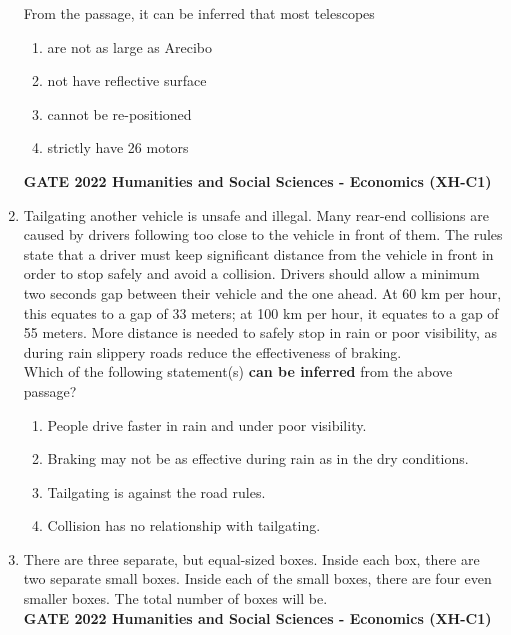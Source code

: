 \documentclass[journal,12pt,onecolumn]{exam}
\theoremstyle{remark}
\begin{document}
\begin{enumerate}
\vspace{1em}

From the passage, it can be inferred that most telescopes 


\begin{enumerate}
    \item are not as large as Arecibo 
    \item not have reflective surface 
    \item cannot be re-positioned 
    \item strictly have 26 motors
\end{enumerate}
\textbf{GATE 2022 Humanities and Social Sciences - Economics (XH-C1)}
 \item Tailgating another vehicle is unsafe and illegal. Many rear-end collisions are caused by drivers following too close to the vehicle in front of them. The rules state that a driver must keep significant distance from the vehicle in front in order to stop safely and avoid a collision. Drivers should allow a minimum two seconds gap between their vehicle and the one ahead. At 60 km per hour, this equates to a gap of 33 meters; at 100 km per hour, it equates to a gap of 55 meters. More distance is needed to safely stop in rain or poor visibility, as during rain slippery roads reduce the effectiveness of braking.\\

    Which of the following statement(s) \textbf{can be inferred} from the above passage?

  
    

    \begin{enumerate}
        \item People drive faster in rain and under poor visibility.
        \item Braking may not be as effective during rain as in the dry conditions.
        \item Tailgating is against the road rules.
        \item Collision has no relationship with tailgating.
    \end{enumerate}


\item There are three separate, but equal-sized boxes. Inside each box, there are two
separate small boxes. Inside each of the small boxes, there are four even smaller
boxes. The total number of boxes will be\underline{\hspace{2cm}}.\\


\textbf{GATE 2022 Humanities and Social Sciences - Economics (XH-C1)}\ 


\end{enumerate}
\end{document}
